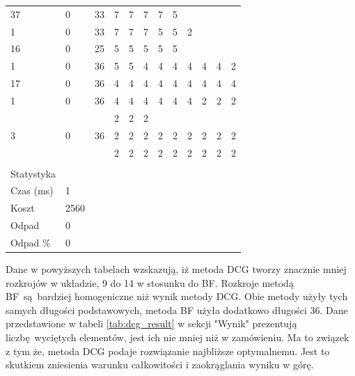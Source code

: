 \begin{longtable}{llllllllllll}
  37                   & 0        & 33        & 7                & 7  & 7  & 7 & 5 &   &   &   &   \\
  1                    & 0        & 33        & 7                & 7  & 7  & 5 & 5 & 2 &   &   &   \\
  16                   & 0        & 25        & 5                & 5  & 5  & 5 & 5 &   &   &   &   \\
  1                    & 0        & 36        & 5                & 5  & 4  & 4 & 4 & 4 & 4 & 4 & 2 \\
  17                   & 0        & 36        & 4                & 4  & 4  & 4 & 4 & 4 & 4 & 4 & 4 \\
  1                    & 0        & 36        & 4                & 4  & 4  & 4 & 4 & 4 & 2 & 2 & 2 \\
                       &          &           & 2                & 2  & 2  &   &   &   &   &   &   \\
  3                    & 0        & 36        & 2                & 2  & 2  & 2 & 2 & 2 & 2 & 2 & 2 \\
                       &          &           & 2                & 2  & 2  & 2 & 2 & 2 & 2 & 2 & 2 \\
                       &          &           &                  &    &    &   &   &   &   &   &   \\
  Statystyka            &          &           &                  &    &    &   &   &   &   &   &   \\
Czas (ms)       & 1        &           &                  &    &    &   &   &   &   &   &   \\
  Koszt           & 2560     &           &                  &    &    &   &   &   &   &   &   \\
  Odpad                & 0        &           &                  &    &    &   &   &   &   &   &   \\
  Odpad \%        & 0        &           &                  &    &    &   &   &   &   &   & \\
  \hline
\end{longtable}

Dane w powyższych tabelach wzskazują, iż metoda DCG tworzy znacznie mniej rozkrojów w układzie, 9 do 14 w stosunku do BF. Rozkroje metodą BF są bardziej homogeniczne niż wynik metody DCG. Obie metody użyły tych samych długości podstawowych, metoda BF użyła dodatkowo długości 36. Dane przedstawione w tabeli \ref{tab:dcg_result} w sekcji "Wynik" prezentują liczbę wyciętych elementów, jest ich nie mniej niż w zamówieniu. Ma to związek z tym że, metoda DCG podaje rozwiązanie najbliższe optymalnemu. Jest to skutkiem zniesienia warunku całkowitości i zaokrąglania wyniku w górę.


